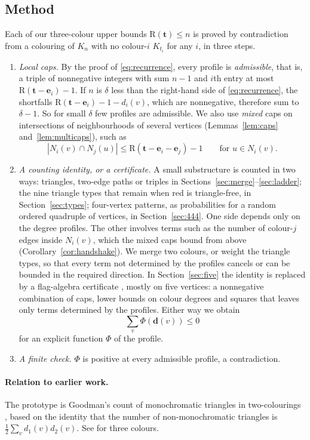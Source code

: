 \documentclass[11pt]{article}
\theoremstyle{spacedplain}
\theoremstyle{spaceddef}
\theoremstyle{spacedremark}
\newcommand{\R}{\mathrm{R}}
\newcommand{\bt}{\mathbf{t}}
\newcommand{\e}{\mathbf{e}}
\begin{document}
\subsection{Method}

Each of our three-colour upper bounds $\R(\bt)\le n$ is proved by contradiction from a colouring of $K_n$ with no colour-$i$ $K_{t_i}$ for any $i$, in three steps.
\begin{enumerate}[label=(\roman*)]
\item \emph{Local caps.}
By the proof of \eqref{eq:recurrence}, every profile is \emph{admissible}, that is, a triple of nonnegative integers with sum $n-1$ and $i$th entry at most $\R(\bt-\e_i)-1$.
If $n$ is $\delta$ less than the right-hand side of \eqref{eq:recurrence}, the shortfalls $\R(\bt-\e_i)-1-d_i(v)$, which are nonnegative, therefore sum to $\delta-1$.
So for small $\delta$ few profiles are admissible.
We also use \emph{mixed} caps on intersections of neighbourhoods of several vertices (Lemmas~\ref{lem:caps} and~\ref{lem:multicaps}), such as
\[
|N_i(v)\cap N_j(u)|\le\R(\bt-\e_i-\e_j)-1\qquad\text{for } u\in N_i(v).
\]
\item \emph{A counting identity, or a certificate.}
A small substructure is counted in two ways: triangles, two-edge paths or triples in Sections~\ref{sec:merge}--\ref{sec:ladder}; the nine triangle types that remain when red is triangle-free, in Section~\ref{sec:types}; four-vertex patterns, as probabilities for a random ordered quadruple of vertices, in Section~\ref{sec:444}.
One side depends only on the degree profiles.
The other involves terms such as the number of colour-$j$ edges inside $N_i(v)$, which the mixed caps bound from above (Corollary~\ref{cor:handshake}).
We merge two colours, or weight the triangle types, so that every term not determined by the profiles cancels or can be bounded in the required direction.
In Section~\ref{sec:five} the identity is replaced by a flag-algebra certificate \cite{Raz07}, mostly on five vertices: a nonnegative combination of caps, lower bounds on colour degrees and squares that leaves only terms determined by the profiles.
Either way we obtain
\[
\sum_v\Phi(\mathbf d(v))\le 0
\]
for an explicit function $\Phi$ of the profile.
\item \emph{A finite check.}
$\Phi$ is positive at every admissible profile, a contradiction.
\end{enumerate}

\paragraph{Relation to earlier work.}
The prototype is Goodman's count of monochromatic triangles in two-colourings \cite{Goo59}, based on the identity that the number of non-monochromatic triangles is $\frac12\sum_v d_1(v)d_2(v)$.
See \cite{Goo85} for three colours.
\end{document}
